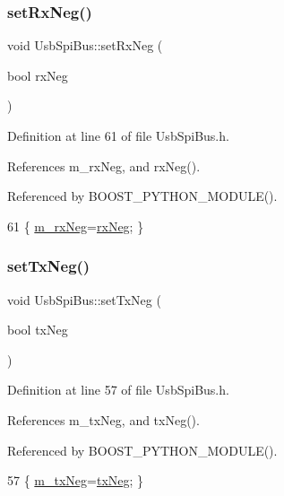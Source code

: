 \subsubsection{\texorpdfstring{set\+Rx\+Neg()}{setRxNeg()}}
{\footnotesize\ttfamily void Usb\+Spi\+Bus\+::set\+Rx\+Neg (\begin{DoxyParamCaption}\item[{bool}]{rx\+Neg }\end{DoxyParamCaption})\hspace{0.3cm}{\ttfamily [inline]}}



Definition at line 61 of file Usb\+Spi\+Bus.\+h.



References m\+\_\+rx\+Neg, and rx\+Neg().



Referenced by B\+O\+O\+S\+T\+\_\+\+P\+Y\+T\+H\+O\+N\+\_\+\+M\+O\+D\+U\+L\+E().


\begin{DoxyCode}
61 \{ \hyperlink{classUsbSpiBus_abf36f2df24c3ec5363efe73c9771bbc8}{m\_rxNeg}=\hyperlink{classUsbSpiBus_ab24f6e85697305b26997b8dec3f18254}{rxNeg}; \}
\end{DoxyCode}
\mbox{\label{classUsbSpiBus_a6b15114d79e0d8002ba42f0301ff22a1}} 
\subsubsection{\texorpdfstring{set\+Tx\+Neg()}{setTxNeg()}}
{\footnotesize\ttfamily void Usb\+Spi\+Bus\+::set\+Tx\+Neg (\begin{DoxyParamCaption}\item[{bool}]{tx\+Neg }\end{DoxyParamCaption})\hspace{0.3cm}{\ttfamily [inline]}}



Definition at line 57 of file Usb\+Spi\+Bus.\+h.



References m\+\_\+tx\+Neg, and tx\+Neg().



Referenced by B\+O\+O\+S\+T\+\_\+\+P\+Y\+T\+H\+O\+N\+\_\+\+M\+O\+D\+U\+L\+E().


\begin{DoxyCode}
57 \{ \hyperlink{classUsbSpiBus_a48528e7dcb036ecc1732581a89e16d10}{m\_txNeg}=\hyperlink{classUsbSpiBus_a08605d71903fc384ed119842833485f1}{txNeg}; \}
\end{DoxyCode}
\mbox{\label{classUsbSpiBus_a08605d71903fc384ed119842833485f1}} 
